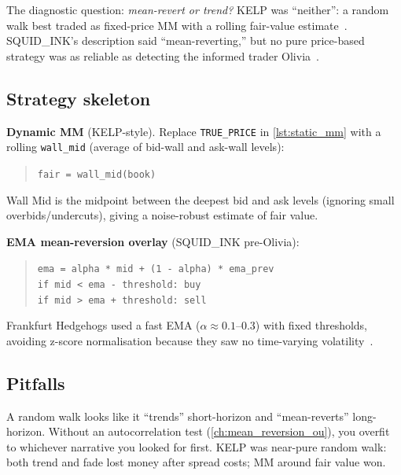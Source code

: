 The diagnostic question: \emph{mean-revert or trend?}  KELP was
``neither'': a random walk best traded as fixed-price MM with a
rolling fair-value estimate~\citep{frankfurthedgehogs2025}.
SQUID\_INK's description said ``mean-reverting,'' but no pure
price-based strategy was as reliable as detecting the informed trader
Olivia~\citep{frankfurthedgehogs2025}.

\subsection{Strategy skeleton}

\noindent
\textbf{Dynamic MM} (KELP-style).  Replace \texttt{TRUE\_PRICE} in
\cref{lst:static_mm} with a rolling \texttt{wall\_mid} (average of
bid-wall and ask-wall levels):

\begin{quote}
\texttt{fair = wall\_mid(book)}
\end{quote}

\noindent
Wall Mid is the midpoint between the deepest bid and ask levels
(ignoring small overbids/undercuts), giving a noise-robust estimate
of fair value.

\noindent
\textbf{EMA mean-reversion overlay} (SQUID\_INK pre-Olivia):

\begin{quote}
\texttt{ema = alpha * mid + (1 - alpha) * ema\_prev}\\
\texttt{if mid < ema - threshold: buy}\\
\texttt{if mid > ema + threshold: sell}
\end{quote}

\noindent
Frankfurt Hedgehogs used a fast EMA ($\alpha \approx 0.1$--$0.3$)
with fixed thresholds, avoiding z-score normalisation because they
saw no time-varying volatility~\citep{frankfurthedgehogs2025}.

\subsection{Pitfalls}

\begin{pitfallbox}
A random walk looks like it ``trends'' short-horizon and
``mean-reverts'' long-horizon.  Without an autocorrelation test
(\cref{ch:mean_reversion_ou}), you overfit to whichever narrative you
looked for first.  KELP was near-pure random walk: both trend and
fade lost money after spread costs; MM around fair value won.
\end{pitfallbox}


